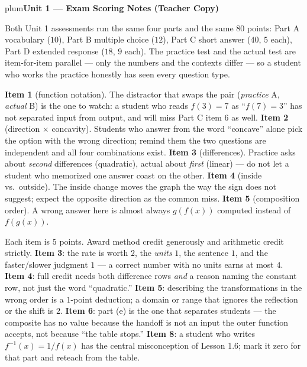 \documentclass[10pt]{article}
\begin{document}


\newpage
\thispagestyle{empty}

\begin{headlinebox}{plum}{\color{white}\bfseries Unit 1 --- Exam Scoring Notes (Teacher Copy)}\end{headlinebox}

\vspace{4pt}
\noindent\small
Both Unit 1 assessments run the same four parts and the same $80$ points:
Part A vocabulary ($10$), Part B multiple choice ($12$), Part C short answer
($40$, $5$ each), Part D extended response ($18$, $9$ each). The practice test
and the actual test are item-for-item parallel --- only the numbers and the
contexts differ --- so a student who works the practice honestly has seen every
question type.

\vspace{2pt}
\begin{teachernote}
\textbf{Item 1} (function notation). The distractor that swaps the pair
(\emph{practice} A, \emph{actual} B) is the one to watch: a student who reads
$f(3) = 7$ as ``$f(7) = 3$'' has not separated input from output, and will miss
Part C item 6 as well. \textbf{Item 2} (direction $\times$ concavity). Students
who answer from the word ``concave'' alone pick the option with the wrong
direction; remind them the two questions are independent and all four
combinations exist. \textbf{Item 3} (differences). Practice asks about
\emph{second} differences (quadratic), actual about \emph{first} (linear) ---
do not let a student who memorized one answer coast on the other.
\textbf{Item 4} (inside vs.\ outside). The inside change moves the graph the way
the sign does not suggest; expect the opposite direction as the common miss.
\textbf{Item 5} (composition order). A wrong answer here is almost always
$g(f(x))$ computed instead of $f(g(x))$.
\end{teachernote}

\begin{teachernote}
Each item is $5$ points. Award method credit generously and arithmetic credit
strictly. \textbf{Item 3}: the rate is worth $2$, the \emph{units} $1$, the
sentence $1$, and the faster/slower judgment $1$ --- a correct number with no
units earns at most $4$. \textbf{Item 4}: full credit needs both difference rows
\emph{and} a reason naming the constant row, not just the word ``quadratic.''
\textbf{Item 5}: describing the transformations in the wrong order is a $1$-point
deduction; a domain or range that ignores the reflection or the shift is $2$.
\textbf{Item 6}: part (e) is the one that separates students --- the composite has
no value because the handoff is not an input the outer function accepts, not
because ``the table stops.'' \textbf{Item 8}: a student who writes
$f^{-1}(x) = 1/f(x)$ has the central misconception of Lesson 1.6; mark it zero
for that part and reteach from the table.
\end{teachernote}
\end{document}
